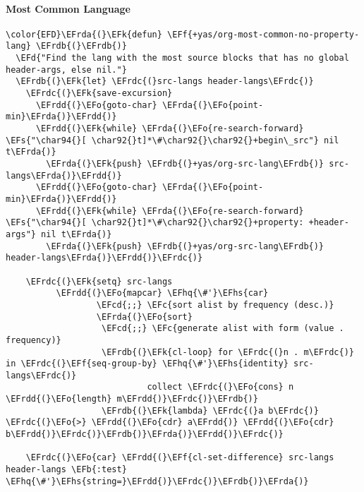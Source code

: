 \documentclass{article}
\newcommand{\EFc}[1]{\textcolor{EFc}{#1}} %
\newcommand{\EFcd}[1]{\textcolor{EFcd}{#1}} %
\newcommand{\EFs}[1]{\textcolor{EFs}{#1}} %
\newcommand{\EFd}[1]{\textcolor{EFd}{#1}} %
\newcommand{\EFk}[1]{\textcolor{EFk}{#1}} %
\newcommand{\EFb}[1]{\textcolor{EFb}{#1}} %
\newcommand{\EFf}[1]{\textcolor{EFf}{#1}} %
\newcommand{\EFo}[1]{\textcolor{EFo}{#1}} %
\newcommand{\EFhq}[1]{#1} %
\newcommand{\EFhs}[1]{\textcolor{EFhs}{#1}} %
\newcommand{\EFrda}[1]{\textcolor{EFrda}{#1}} %
\newcommand{\EFrdb}[1]{\textcolor{EFrdb}{#1}} %
\newcommand{\EFrdc}[1]{\textcolor{EFrdc}{#1}} %
\newcommand{\EFrdd}[1]{\textcolor{EFrdd}{#1}} %
\begin{document}
\paragraph{Most Common Language}
\label{sec:org9dfaafd}
\begin{Code}
\begin{Verbatim}
\color{EFD}\EFrda{(}\EFk{defun} \EFf{+yas/org-most-common-no-property-lang} \EFrdb{(}\EFrdb{)}
  \EFd{"Find the lang with the most source blocks that has no global header-args, else nil."}
  \EFrdb{(}\EFk{let} \EFrdc{(}src-langs header-langs\EFrdc{)}
    \EFrdc{(}\EFk{save-excursion}
      \EFrdd{(}\EFo{goto-char} \EFrda{(}\EFo{point-min}\EFrda{)}\EFrdd{)}
      \EFrdd{(}\EFk{while} \EFrda{(}\EFo{re-search-forward} \EFs{"\char94{}[ \char92{}t]*\#\char92{}\char92{}+begin\_src"} nil t\EFrda{)}
        \EFrda{(}\EFk{push} \EFrdb{(}+yas/org-src-lang\EFrdb{)} src-langs\EFrda{)}\EFrdd{)}
      \EFrdd{(}\EFo{goto-char} \EFrda{(}\EFo{point-min}\EFrda{)}\EFrdd{)}
      \EFrdd{(}\EFk{while} \EFrda{(}\EFo{re-search-forward} \EFs{"\char94{}[ \char92{}t]*\#\char92{}\char92{}+property: +header-args"} nil t\EFrda{)}
        \EFrda{(}\EFk{push} \EFrdb{(}+yas/org-src-lang\EFrdb{)} header-langs\EFrda{)}\EFrdd{)}\EFrdc{)}

    \EFrdc{(}\EFk{setq} src-langs
          \EFrdd{(}\EFo{mapcar} \EFhq{\#'}\EFhs{car}
                  \EFcd{;;} \EFc{sort alist by frequency (desc.)}
                  \EFrda{(}\EFo{sort}
                   \EFcd{;;} \EFc{generate alist with form (value . frequency)}
                   \EFrdb{(}\EFk{cl-loop} for \EFrdc{(}n . m\EFrdc{)} in \EFrdc{(}\EFf{seq-group-by} \EFhq{\#'}\EFhs{identity} src-langs\EFrdc{)}
                            collect \EFrdc{(}\EFo{cons} n \EFrdd{(}\EFo{length} m\EFrdd{)}\EFrdc{)}\EFrdb{)}
                   \EFrdb{(}\EFk{lambda} \EFrdc{(}a b\EFrdc{)} \EFrdc{(}\EFo{>} \EFrdd{(}\EFo{cdr} a\EFrdd{)} \EFrdd{(}\EFo{cdr} b\EFrdd{)}\EFrdc{)}\EFrdb{)}\EFrda{)}\EFrdd{)}\EFrdc{)}

    \EFrdc{(}\EFo{car} \EFrdd{(}\EFf{cl-set-difference} src-langs header-langs \EFb{:test} \EFhq{\#'}\EFhs{string=}\EFrdd{)}\EFrdc{)}\EFrdb{)}\EFrda{)}

\end{Verbatim}
\end{Code}
\end{document}
